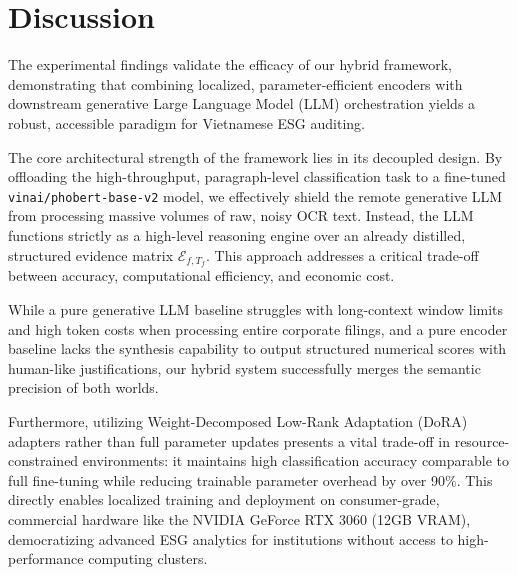 \documentclass{article}
\theoremstyle{plain}
\theoremstyle{definition}
\theoremstyle{remark}
\begin{document}
\section{Discussion}
\label{sec:discussion}

The experimental findings validate the efficacy of our hybrid framework, demonstrating that combining localized, parameter-efficient encoders with downstream generative Large Language Model (LLM) orchestration yields a robust, accessible paradigm for Vietnamese ESG auditing. 

The core architectural strength of the framework lies in its decoupled design. By offloading the high-throughput, paragraph-level classification task to a fine-tuned \texttt{vinai/phobert-base-v2} model, we effectively shield the remote generative LLM from processing massive volumes of raw, noisy OCR text. Instead, the LLM functions strictly as a high-level reasoning engine over an already distilled, structured evidence matrix $\mathcal{E}_{f,T_f}$. This approach addresses a critical trade-off between accuracy, computational efficiency, and economic cost. 

While a pure generative LLM baseline struggles with long-context window limits and high token costs when processing entire corporate filings, and a pure encoder baseline lacks the synthesis capability to output structured numerical scores with human-like justifications, our hybrid system successfully merges the semantic precision of both worlds. 

Furthermore, utilizing Weight-Decomposed Low-Rank Adaptation (DoRA) adapters rather than full parameter updates presents a vital trade-off in resource-constrained environments: it maintains high classification accuracy comparable to full fine-tuning while reducing trainable parameter overhead by over 90\%. This directly enables localized training and deployment on consumer-grade, commercial hardware like the NVIDIA GeForce RTX 3060 (12GB VRAM), democratizing advanced ESG analytics for institutions without access to high-performance computing clusters.
\end{document}
